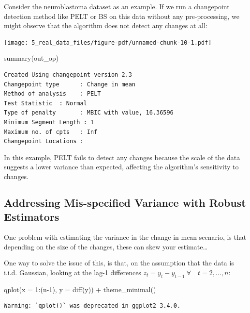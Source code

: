 \documentclass[
  letterpaper,
  DIV=11,
  numbers=noendperiod]{scrreprt}
\newenvironment{Shaded}{\begin{snugshade}}{\end{snugshade}}
\newcommand{\AttributeTok}[1]{\textcolor[rgb]{0.40,0.45,0.13}{#1}}
\newcommand{\DecValTok}[1]{\textcolor[rgb]{0.68,0.00,0.00}{#1}}
\newcommand{\FunctionTok}[1]{\textcolor[rgb]{0.28,0.35,0.67}{#1}}
\newcommand{\NormalTok}[1]{\textcolor[rgb]{0.00,0.23,0.31}{#1}}
\newcommand{\SpecialCharTok}[1]{\textcolor[rgb]{0.37,0.37,0.37}{#1}}
\begin{document}
Consider the neuroblastoma dataset as an example. If we run a
changepoint detection method like PELT or BS on this data without any
pre-processing, we might observe that the algorithm does not detect any
changes at all:

\texttt{[image: 5\_real\_data\_files/figure-pdf/unnamed-chunk-10-1.pdf]}

\begin{Shaded}
\begin{Highlighting}[]
\FunctionTok{summary}\NormalTok{(out\_op)}
\end{Highlighting}
\end{Shaded}

\begin{verbatim}
Created Using changepoint version 2.3 
Changepoint type      : Change in mean 
Method of analysis    : PELT 
Test Statistic  : Normal 
Type of penalty       : MBIC with value, 16.36596 
Minimum Segment Length : 1 
Maximum no. of cpts   : Inf 
Changepoint Locations :  
\end{verbatim}

In this example, PELT fails to detect any changes because the scale of
the data suggests a lower variance than expected, affecting the
algorithm's sensitivity to changes.

\subsection{Addressing Mis-specified Variance with Robust
Estimators}\label{addressing-mis-specified-variance-with-robust-estimators}

One problem with estimating the variance in the change-in-mean scenario,
is that depending on the size of the changes, these can skew your
estimate\ldots{}

One way to solve the issue of this, is that, on the assumption that the
data is i.i.d. Gaussian, looking at the lag-1 differences
\(z_t = y_t - y_{t-1} \ \forall \quad t = 2, \dots, n\):

\begin{Shaded}
\begin{Highlighting}[]
\FunctionTok{qplot}\NormalTok{(}\AttributeTok{x =} \DecValTok{1}\SpecialCharTok{:}\NormalTok{(n}\DecValTok{{-}1}\NormalTok{), }\AttributeTok{y =} \FunctionTok{diff}\NormalTok{(y)) }\SpecialCharTok{+} \FunctionTok{theme\_minimal}\NormalTok{()}
\end{Highlighting}
\end{Shaded}

\begin{verbatim}
Warning: `qplot()` was deprecated in ggplot2 3.4.0.
\end{verbatim}
\end{document}

